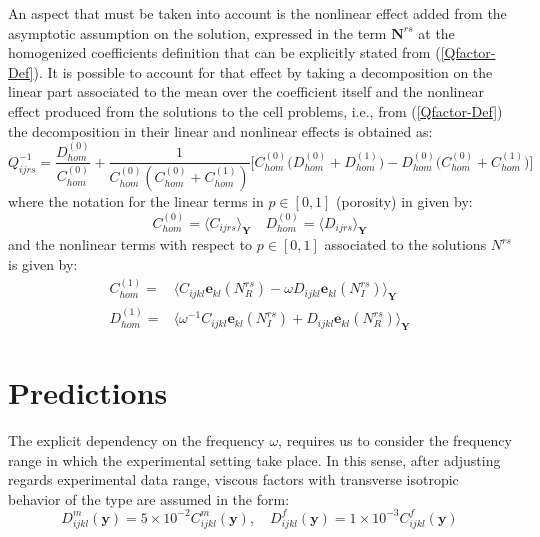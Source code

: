 An aspect that must be taken into account is the nonlinear effect added from the asymptotic assumption on the solution, expressed in the term $\mathbf{N}^{rs}$ at the homogenized coefficients definition that can be explicitly stated from (\ref{Qfactor-Def}).
It is possible to account for that effect by taking a decomposition on the linear part associated to the mean over the coefficient itself and the nonlinear effect produced from the solutions to the cell problems, i.e., from (\ref{Qfactor-Def}) the decomposition in their linear and nonlinear effects is obtained as:
\begin{equation}
    \label{Expansion-Qfactor}
        Q_{ijrs}^{-1} =  \frac{D_{hom}^{(0)}}{C_{hom}^{(0)}} + \frac{1}{C^{(0)}_{hom}\left( C^{(0)}_{hom} + C^{(1)}_{hom} \right)} \big[C^{(0)}_{hom} \big( D^{(0)}_{hom} + D^{(1)}_{hom}\big) - D^{(0)}_{hom}\big( C^{(0)}_{hom} + C^{(1)}_{hom} \big) \big]
\end{equation}
where the notation for the linear terms in $p \in [0,1]$ (porosity) in given by:
\begin{equation*}
    C^{(0)}_{hom} = \langle C_{ijrs} \rangle_{\mathbf{Y}} \quad  D^{(0)}_{hom} = \langle D_{ijrs} \rangle_{\mathbf{Y}}
\end{equation*}
and the nonlinear terms with respect to $p \in [0,1]$ associated to the solutions $N^{rs}$ is given by:
\begin{equation*}
    \begin{array}{cc}
        C^{(1)}_{hom} =& \langle C_{ijkl}\mathbf{e}_{kl}(N^{rs}_R) - \omega D_{ijkl}\mathbf{e}_{kl}(N^{rs}_I) \rangle_{\mathbf{Y}} \\
        D^{(1)}_{hom} =& \langle \omega^{-1} C_{ijkl}\mathbf{e}_{kl}(N^{rs}_I) + D_{ijkl}\mathbf{e}_{kl}(N^{rs}_R) \rangle_{\mathbf{Y}} 
    \end{array}
\end{equation*}




\section{Predictions}

The explicit dependency on the frequency $\omega$, requires us to consider the frequency range in which the experimental setting take place. In this sense, after adjusting regards experimental data range, viscous factors with transverse isotropic behavior of the type are assumed in the form:
\begin{equation*}
    D^m_{ijkl} (\mathbf{y}) = 5\times10^{-2} C^{m}_{ijkl}(\mathbf{y}), \quad D^f_{ijkl}(\mathbf{y}) = 1 \times 10^{-3} C^{f}_{ijkl}(\mathbf{y})
\end{equation*}

